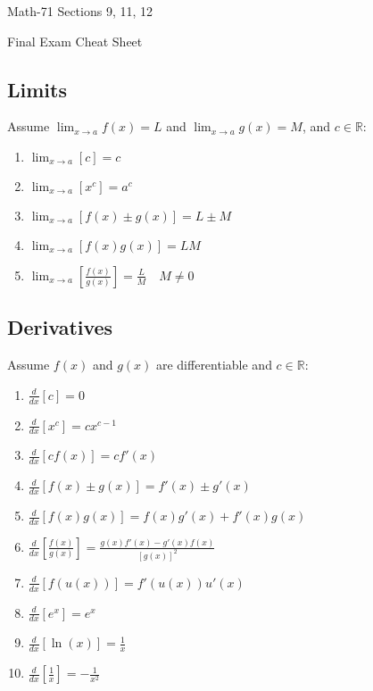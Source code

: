 \documentclass[letterpaper,12pt,fleqn]{article}
\begin{document}
\begin{center}
  \large
  Math-71 Sections 9, 11, 12

  \Large
  Final Exam Cheat Sheet
\end{center}

\vspace{0.25in}

\subsection*{Limits}

Assume \(\displaystyle\lim_{x\to a}f(x)=L\) and \(\displaystyle\lim_{x\to a}g(x)=M\), and \(c\in\mathbb{R}\):
\begin{enumerate}[left=0pt]
\item \(\displaystyle\lim_{x\to a}[c]=c\)
\item \(\displaystyle\lim_{x\to a}[x^c]=a^c\)
\item \(\displaystyle\lim_{x\to a}[f(x)\pm g(x)]=L\pm M\)
\item \(\displaystyle\lim_{x\to a}[f(x)g(x)]=LM\)
\item \(\displaystyle\lim_{x\to a}\left[\frac{f(x)}{g(x)}\right]=\frac{L}{M}\quad M\ne0\)
\end{enumerate}

\subsection*{Derivatives}

Assume \(f(x)\) and \(g(x)\) are differentiable and \(c\in\mathbb{R}\):
\begin{enumerate}[left=0pt]
\item \(\frac{d}{dx}[c]=0\)
\item \(\frac{d}{dx}[x^c]=cx^{c-1}\)
\item \(\frac{d}{dx}[cf(x)]=cf'(x)\)
\item \(\frac{d}{dx}[f(x)\pm g(x)]=f'(x)\pm g'(x)\)
\item \(\frac{d}{dx}[f(x)g(x)]=f(x)g'(x)+f'(x)g(x)\)
\item \(\frac{d}{dx}\left[\frac{f(x)}{g(x)}\right]=\frac{g(x)f'(x)-g'(x)f(x)}{[g(x)]^2}\)
\item \(\frac{d}{dx}\left[f\left(u(x)\right)\right]=f'\left(u(x)\right)u'(x)\)
\item \(\frac{d}{dx}\left[e^x\right]=e^x\)
\item \(\frac{d}{dx}\left[\ln(x)\right]=\frac{1}{x}\)
\item \(\frac{d}{dx}\left[\frac{1}{x}\right]=-\frac{1}{x^2}\)
\end{enumerate}
\end{document}
